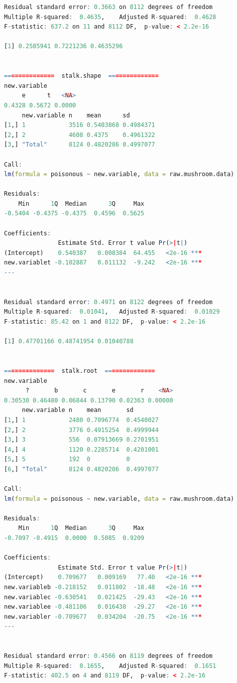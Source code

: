 \documentclass[12pt]{article}
\begin{document}
\begin{lstlisting}[language = R]
Residual standard error: 0.3663 on 8112 degrees of freedom
Multiple R-squared:  0.4635,	Adjusted R-squared:  0.4628 
F-statistic: 637.2 on 11 and 8112 DF,  p-value: < 2.2e-16

[1] 0.2585941 0.7221236 0.4635296


==============  stalk.shape  ==============
new.variable
     e      t   <NA> 
0.4328 0.5672 0.0000 
     new.variable n    mean      sd       
[1,] 1            3516 0.5403868 0.4984371
[2,] 2            4608 0.4375    0.4961322
[3,] "Total"      8124 0.4820286 0.4997077

Call:
lm(formula = poisonous ~ new.variable, data = raw.mushroom.data)

Residuals:
    Min      1Q  Median      3Q     Max 
-0.5404 -0.4375 -0.4375  0.4596  0.5625 

Coefficients:
               Estimate Std. Error t value Pr(>|t|)    
(Intercept)    0.540387   0.008384  64.455   <2e-16 ***
new.variablet -0.102887   0.011132  -9.242   <2e-16 ***
---


Residual standard error: 0.4971 on 8122 degrees of freedom
Multiple R-squared:  0.01041,	Adjusted R-squared:  0.01029 
F-statistic: 85.42 on 1 and 8122 DF,  p-value: < 2.2e-16

[1] 0.47701166 0.48741954 0.01040788


==============  stalk.root  ==============
new.variable
      ?       b       c       e       r    <NA> 
0.30530 0.46480 0.06844 0.13790 0.02363 0.00000 
     new.variable n    mean       sd       
[1,] 1            2480 0.7096774  0.4540027
[2,] 2            3776 0.4915254  0.4999944
[3,] 3            556  0.07913669 0.2701951
[4,] 4            1120 0.2285714  0.4201001
[5,] 5            192  0          0        
[6,] "Total"      8124 0.4820286  0.4997077

Call:
lm(formula = poisonous ~ new.variable, data = raw.mushroom.data)

Residuals:
    Min      1Q  Median      3Q     Max 
-0.7097 -0.4915  0.0000  0.5085  0.9209 

Coefficients:
               Estimate Std. Error t value Pr(>|t|)    
(Intercept)    0.709677   0.009169   77.40   <2e-16 ***
new.variableb -0.218152   0.011802  -18.48   <2e-16 ***
new.variablec -0.630541   0.021425  -29.43   <2e-16 ***
new.variablee -0.481106   0.016438  -29.27   <2e-16 ***
new.variabler -0.709677   0.034204  -20.75   <2e-16 ***
---


Residual standard error: 0.4566 on 8119 degrees of freedom
Multiple R-squared:  0.1655,	Adjusted R-squared:  0.1651 
F-statistic: 402.5 on 4 and 8119 DF,  p-value: < 2.2e-16


\end{lstlisting}
\end{document}

